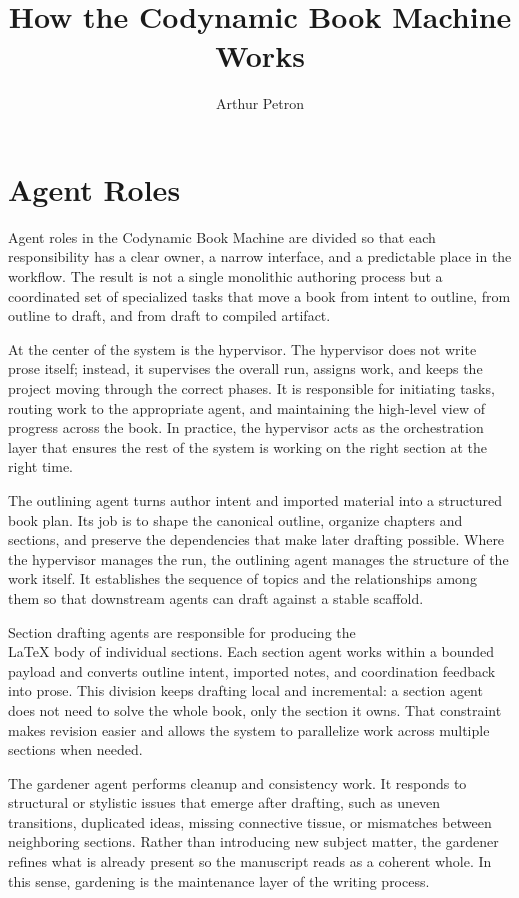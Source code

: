 \documentclass[11pt]{article}
\title{How the Codynamic Book Machine Works}
\author{Arthur Petron}
\begin{document}
\section*{Agent Roles}

Agent roles in the Codynamic Book Machine are divided so that each responsibility has a clear owner, a narrow interface, and a predictable place in the workflow. The result is not a single monolithic authoring process but a coordinated set of specialized tasks that move a book from intent to outline, from outline to draft, and from draft to compiled artifact.

At the center of the system is the hypervisor. The hypervisor does not write prose itself; instead, it supervises the overall run, assigns work, and keeps the project moving through the correct phases. It is responsible for initiating tasks, routing work to the appropriate agent, and maintaining the high-level view of progress across the book. In practice, the hypervisor acts as the orchestration layer that ensures the rest of the system is working on the right section at the right time.

The outlining agent turns author intent and imported material into a structured book plan. Its job is to shape the canonical outline, organize chapters and sections, and preserve the dependencies that make later drafting possible. Where the hypervisor manages the run, the outlining agent manages the structure of the work itself. It establishes the sequence of topics and the relationships among them so that downstream agents can draft against a stable scaffold.

Section drafting agents are responsible for producing the \\LaTeX{} body of individual sections. Each section agent works within a bounded payload and converts outline intent, imported notes, and coordination feedback into prose. This division keeps drafting local and incremental: a section agent does not need to solve the whole book, only the section it owns. That constraint makes revision easier and allows the system to parallelize work across multiple sections when needed.

The gardener agent performs cleanup and consistency work. It responds to structural or stylistic issues that emerge after drafting, such as uneven transitions, duplicated ideas, missing connective tissue, or mismatches between neighboring sections. Rather than introducing new subject matter, the gardener refines what is already present so the manuscript reads as a coherent whole. In this sense, gardening is the maintenance layer of the writing process.
\end{document}
